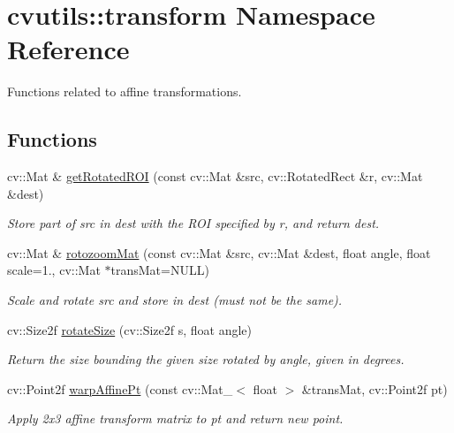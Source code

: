 \hypertarget{namespacecvutils_1_1transform}{\section{cvutils\-:\-:transform Namespace Reference}
\label{namespacecvutils_1_1transform}
}


Functions related to affine transformations.  


\subsection*{Functions}
\begin{DoxyCompactItemize}
\item 
cv\-::\-Mat \& \hyperlink{namespacecvutils_1_1transform_a4ce309a7263b6b2cb9492e67d8752695}{get\-Rotated\-R\-O\-I} (const cv\-::\-Mat \&src, cv\-::\-Rotated\-Rect \&r, cv\-::\-Mat \&dest)
\begin{DoxyCompactList}\small\item\em Store part of {\ttfamily src} in {\ttfamily dest} with the R\-O\-I specified by {\ttfamily r}, and return {\ttfamily dest}. \end{DoxyCompactList}\item 
cv\-::\-Mat \& \hyperlink{namespacecvutils_1_1transform_a8e3ddc3efa023809e71b2ed45b5fe325}{rotozoom\-Mat} (const cv\-::\-Mat \&src, cv\-::\-Mat \&dest, float angle, float scale=1., cv\-::\-Mat $\ast$trans\-Mat=N\-U\-L\-L)
\begin{DoxyCompactList}\small\item\em Scale and rotate {\ttfamily src} and store in {\ttfamily dest} (must not be the same). \end{DoxyCompactList}\item 
cv\-::\-Size2f \hyperlink{namespacecvutils_1_1transform_a4ba17f552aeae6ddce6ca2da28936f42}{rotate\-Size} (cv\-::\-Size2f s, float angle)
\begin{DoxyCompactList}\small\item\em Return the size bounding the given size rotated by {\ttfamily angle}, given in degrees. \end{DoxyCompactList}\item 
cv\-::\-Point2f \hyperlink{namespacecvutils_1_1transform_a0b54497d842a62c5f538004ac93ba5ff}{warp\-Affine\-Pt} (const cv\-::\-Mat\-\_\-$<$ float $>$ \&trans\-Mat, cv\-::\-Point2f pt)
\begin{DoxyCompactList}\small\item\em Apply 2x3 affine transform matrix to {\ttfamily pt} and return new point. \end{DoxyCompactList}\end{DoxyCompactItemize}


